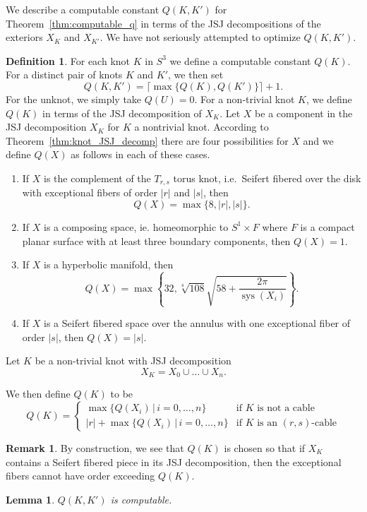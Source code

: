 \documentclass{amsart} %
\DeclareMathOperator{\sys}{sys}
\theoremstyle{thm}
\newtheorem{lem}[Theorem]{Lemma}
\theoremstyle{definition}
\newtheorem{defi}[Theorem]{Definition}
\newtheorem{rem}[Theorem]{Remark}
\numberwithin{equation}{section}
\begin{document}
We describe a computable constant $Q(K,K')$ for Theorem~\ref{thm:computable_q} in terms of the JSJ decompositions of the exteriors $X_K$ and $X_{K'}$. We have not seriously attempted to optimize $Q(K,K')$.
\begin{defi}\label{def:Q}
For each knot $K$ in $S^3$ we define a computable constant $Q(K)$. For a distinct pair of knots $K$ and $K'$, we then set
\[
Q(K,K')=\lceil\max \{Q(K), Q(K')\}\rceil +1.
\]
For the unknot, we simply take $Q(U)=0$. For a non-trivial knot $K$, we define $Q(K)$ in terms of the JSJ decomposition of $X_K$.
Let $X$ be a component in the JSJ decomposition $X_K$ for $K$ a nontrivial knot. According to Theorem~\ref{thm:knot_JSJ_decomp} there are four possibilities for $X$ and we define $Q(X)$ as follows in each of these cases.
\begin{enumerate}
    \item If $X$ is the complement of the $T_{r,s}$ torus knot, i.e.\ Seifert fibered over the disk with exceptional fibers of order $|r|$ and $|s|$, then 
    \[Q(X)=\max\{8,|r|,|s|\}.\]
    \item If $X$ is a composing space, ie. homeomorphic to $S^1\times F$ where $F$ is a compact planar surface with at least three boundary components, then $Q(X)=1$.
    \item If $X$ is a hyperbolic manifold, then 
    \[Q(X)=\max\left\{ 32,\sqrt[4]{108}\sqrt{58+ \frac{2\pi}{\sys(X_i)}}\right\}.\]
    \item If $X$ is a Seifert fibered space over the annulus with one exceptional fiber of order $|s|$, then $Q(X)=|s|$.
\end{enumerate} 
Let $K$ be a non-trivial knot with JSJ decomposition
\[
X_K=X_0\cup \dots \cup X_n.
\]

We then define $Q(K)$ to be
\[
Q(K)=\begin{cases}
\max \{ Q(X_i)\,|\, i=0,\dots, n\} &\text{if $K$ is not a cable}\\
|r|+\max\{Q(X_i)\,|\, i=0,\dots, n\} &\text{if $K$ is an $(r,s)$-cable}
\end{cases}
\]
\end{defi}
\begin{rem}
By construction, we see that $Q(K)$ is chosen so that if $X_K$ contains a Seifert fibered piece in its JSJ decomposition, then the exceptional fibers cannot have order exceeding $Q(K)$.
\end{rem}

\begin{lem}
    $Q(K,K')$ is computable.
\end{lem}
\end{document}
